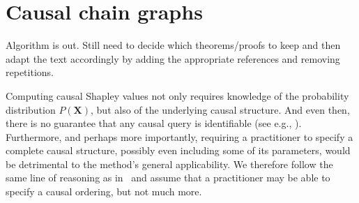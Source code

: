\documentclass{article}
\newcommand{\vX}{\mathbf{X}}
\newcommand{\expectation}{\mathbb{E}}
\newcommand{\dodo}{\mathit{do}}
\newcommand{\ldo}[1]{\dodo(X_{#1} = x_{#1})}
\newcommand{\comment}[1]{{\color{red} #1}}
\begin{document}
%


\section{Causal chain graphs}

\comment{Algorithm is out. Still need to decide which theorems/proofs to keep and then adapt the text accordingly by adding the appropriate references and removing repetitions.}

Computing causal Shapley values not only requires knowledge of the probability distribution $P(\vX)$, but also of the underlying causal structure. And even then, there is no guarantee that any causal query is identifiable (see e.g., \cite{pearl2012calculus}).
Furthermore, and perhaps more importantly, requiring a practitioner to specify a complete causal structure, possibly even including some of its parameters, would be detrimental to the method's general applicability. We therefore follow the same line of reasoning as in~\cite{frye2019asymmetric} and assume that a practitioner may be able to specify a causal ordering, but not much more.
\end{document}
